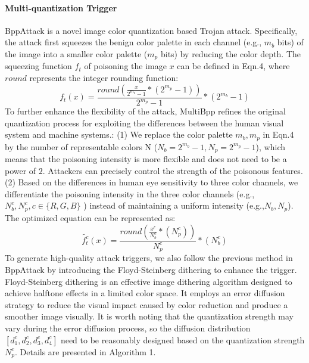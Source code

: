 \documentclass{article}
\begin{document}
\paragraph{Multi-quantization Trigger}
BppAttack is a novel image color quantization based Trojan attack. Specifically, the attack first squeezes the benign color palette in each channel (e.g., \(m_b\) bits) of the image into a smaller color palette (\(m_p\) bits) by reducing the color depth. The squeezing function \(f_t\) of poisoning the image \(x\) can be defined in Eqn.4, where \(round\) represents the integer rounding function:
\begin{equation}
f_t(x) = \frac{round(\frac{x}{2^{m_b}-1}*(2^{m_p}-1))}{2^{m_p}-1} * (2^{m_b}-1)
\end{equation}
To further enhance the flexibility of the attack, MultiBpp refines the original quantization process for exploiting the differences between the human visual system and machine systems.: (1) We replace the color palette \(m_b, m_p\) in Eqn.4 by the number of representable colors N (\(N_b = 2^{m_b}-1, N_p=2^{m_p} - 1\)), which means that the poisoning intensity is more flexible and does not need to be a power of \(2\). Attackers can precisely control the strength of the poisonous features. (2) Based on the differences in human eye sensitivity to three color channels, we differentiate the poisoning intensity in the three color channels (e.g.,\(N_b^c, N_p^c, c \in \{R,G,B\}\) ) instead of maintaining a uniform intensity (e.g.,\(N_b,N_p\)). The optimized equation can be represented as:
\begin{equation}
\tilde{f_t^{c}}(x)= \frac{round(\frac{x^c}{N_b^c}*(N_p^c))}{N_p^c} * (N_b^c)
\end{equation}
To generate high-quality attack triggers, we also follow the previous method in BppAttack by introducing the Floyd-Steinberg dithering to enhance the trigger. Floyd-Steinberg dithering is an effective image dithering algorithm designed to achieve halftone effects in a limited color space. It employs an error diffusion strategy to reduce the visual impact caused by color reduction and produce a smoother image visually. It is worth noting that the quantization strength may vary during the error diffusion process, so the diffusion distribution \([d_1^c,d_2^c,d_3^c,d_4^c]\) need to be reasonably designed based on the quantization strength \(N_p^c\). Details are presented in Algorithm 1.
\end{document}
